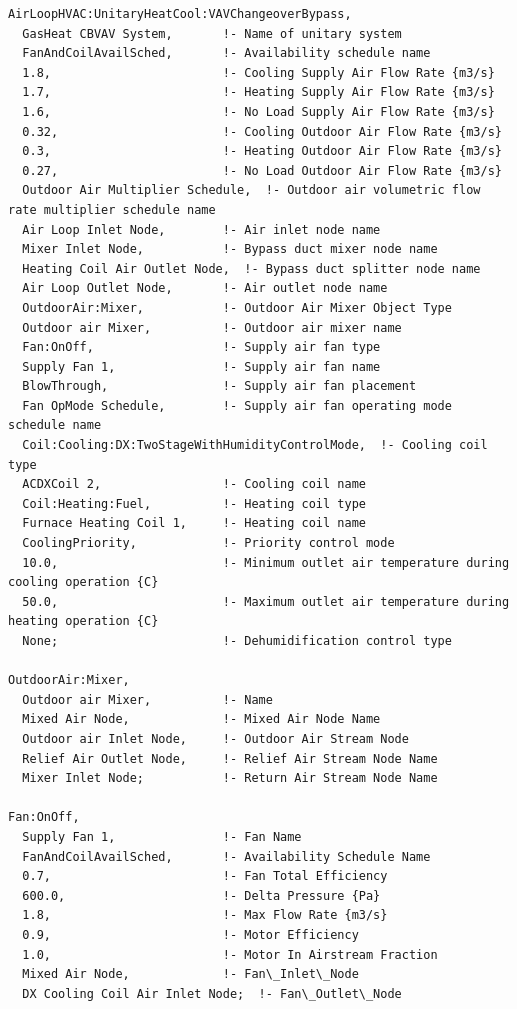 \begin{lstlisting}
AirLoopHVAC:UnitaryHeatCool:VAVChangeoverBypass,
  GasHeat CBVAV System,       !- Name of unitary system
  FanAndCoilAvailSched,       !- Availability schedule name
  1.8,                        !- Cooling Supply Air Flow Rate {m3/s}
  1.7,                        !- Heating Supply Air Flow Rate {m3/s}
  1.6,                        !- No Load Supply Air Flow Rate {m3/s}
  0.32,                       !- Cooling Outdoor Air Flow Rate {m3/s}
  0.3,                        !- Heating Outdoor Air Flow Rate {m3/s}
  0.27,                       !- No Load Outdoor Air Flow Rate {m3/s}
  Outdoor Air Multiplier Schedule,  !- Outdoor air volumetric flow rate multiplier schedule name
  Air Loop Inlet Node,        !- Air inlet node name
  Mixer Inlet Node,           !- Bypass duct mixer node name
  Heating Coil Air Outlet Node,  !- Bypass duct splitter node name
  Air Loop Outlet Node,       !- Air outlet node name
  OutdoorAir:Mixer,           !- Outdoor Air Mixer Object Type
  Outdoor air Mixer,          !- Outdoor air mixer name
  Fan:OnOff,                  !- Supply air fan type
  Supply Fan 1,               !- Supply air fan name
  BlowThrough,                !- Supply air fan placement
  Fan OpMode Schedule,        !- Supply air fan operating mode schedule name
  Coil:Cooling:DX:TwoStageWithHumidityControlMode,  !- Cooling coil type
  ACDXCoil 2,                 !- Cooling coil name
  Coil:Heating:Fuel,          !- Heating coil type
  Furnace Heating Coil 1,     !- Heating coil name
  CoolingPriority,            !- Priority control mode
  10.0,                       !- Minimum outlet air temperature during cooling operation {C}
  50.0,                       !- Maximum outlet air temperature during heating operation {C}
  None;                       !- Dehumidification control type

OutdoorAir:Mixer,
  Outdoor air Mixer,          !- Name
  Mixed Air Node,             !- Mixed Air Node Name
  Outdoor air Inlet Node,     !- Outdoor Air Stream Node
  Relief Air Outlet Node,     !- Relief Air Stream Node Name
  Mixer Inlet Node;           !- Return Air Stream Node Name

Fan:OnOff,
  Supply Fan 1,               !- Fan Name
  FanAndCoilAvailSched,       !- Availability Schedule Name
  0.7,                        !- Fan Total Efficiency
  600.0,                      !- Delta Pressure {Pa}
  1.8,                        !- Max Flow Rate {m3/s}
  0.9,                        !- Motor Efficiency
  1.0,                        !- Motor In Airstream Fraction
  Mixed Air Node,             !- Fan\_Inlet\_Node
  DX Cooling Coil Air Inlet Node;  !- Fan\_Outlet\_Node


\end{lstlisting}
